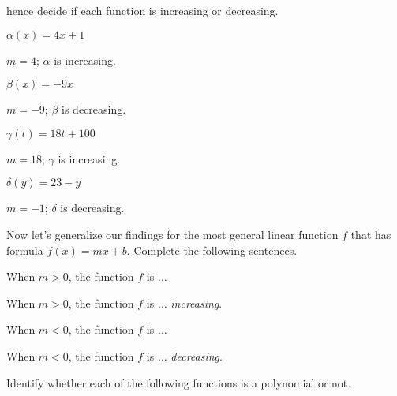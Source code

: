 \begin{exercises}
\begin{problem}
 	hence decide if each function is increasing or decreasing.
 	\begin{multicols}{4}
 		\begin{subproblem}
 			$\alpha(x)=4x+1$
 			\begin{shortsolution}
 				$m=4$; $\alpha$ is increasing.
 			\end{shortsolution}
 		\end{subproblem}
 		\begin{subproblem}
 			$\beta(x)=-9x$
 			\begin{shortsolution}
 				$m=-9$; $\beta$ is decreasing.
 			\end{shortsolution}
 		\end{subproblem}
 		\begin{subproblem}
 			$\gamma(t)=18t+100$
 			\begin{shortsolution}
 				$m=18$; $\gamma$ is increasing.
 			\end{shortsolution}
 		\end{subproblem}
 		\begin{subproblem}
 			$\delta(y)=23-y$
 			\begin{shortsolution}
 				$m=-1$; $\delta$ is decreasing.
 			\end{shortsolution}
 		\end{subproblem}
 	\end{multicols}
 	Now let's generalize our findings for the most general linear function $f$
 	that has formula $f(x)=mx+b$. Complete the following sentences.
 	\begin{subproblem}
 		When $m>0$, the function $f$ is $\ldots$
 		\begin{shortsolution}
 			When $m>0$, the function $f$ is $\ldots$  \emph{increasing}.
 		\end{shortsolution}
 	\end{subproblem}
 	\begin{subproblem}
 		When $m<0$, the function $f$ is $\ldots$
 		\begin{shortsolution}
 			When $m<0$, the function $f$ is $\ldots$  \emph{decreasing}.
 		\end{shortsolution}
 	\end{subproblem}
 	\end{problem}
 	\begin{problem}
 	Identify whether each of the following functions is a polynomial or not.

\end{problem}
\end{exercises}
